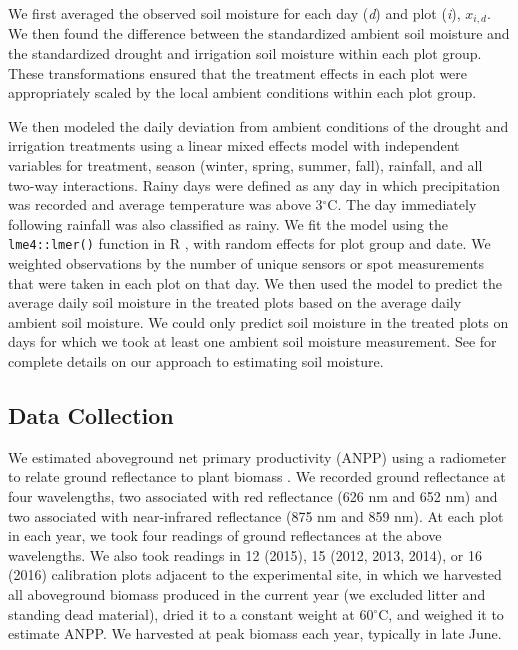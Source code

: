 \documentclass[fleqn,10pt,lineno]{wlpeerj} %
\begin{document}
We first averaged the observed soil moisture for each day (\emph{d}) and
plot (\emph{i}), \(x_{i,d}\).
We then found the difference between the standardized ambient soil
moisture and the standardized drought and irrigation soil moisture
within each plot group. These transformations ensured that the treatment
effects in each plot were appropriately scaled by the local ambient
conditions within each plot group.

We then modeled the daily deviation from ambient conditions of the
drought and irrigation treatments using a linear mixed effects model
with independent variables for treatment, season (winter, spring,
summer, fall), rainfall, and all two-way interactions. Rainy days were
defined as any day in which precipitation was recorded and average
temperature was above 3\(^{\circ}\)C. The day immediately following
rainfall was also classified as rainy. We fit the model using the
\texttt{lme4::lmer()} function \citep{Bates2015} in R \citep{R2016},
with random effects for plot group and date. We weighted observations by
the number of unique sensors or spot measurements that were taken in
each plot on that day. We then used the model to predict the average
daily soil moisture in the treated plots based on the average daily
ambient soil moisture. We could only predict soil moisture in the
treated plots on days for which we took at least one ambient soil
moisture measurement. See \citet{Kleinhesselink2017b} for complete
details on our approach to estimating soil moisture.

\subsection{Data Collection}\label{data-collection}

We estimated aboveground net primary productivity (ANPP) using a
radiometer to relate ground reflectance to plant biomass \citep[see][
for a review]{Byrne2011}. We recorded ground reflectance at four
wavelengths, two associated with red reflectance (626 nm and 652 nm) and
two associated with near-infrared reflectance (875 nm and 859 nm). At
each plot in each year, we took four readings of ground reflectances at
the above wavelengths. We also took readings in 12 (2015), 15 (2012,
2013, 2014), or 16 (2016) calibration plots adjacent to the experimental
site, in which we harvested all aboveground biomass produced in the
current year (we excluded litter and standing dead material), dried it
to a constant weight at 60\(^{\circ}\)C, and weighed it to estimate
ANPP. We harvested at peak biomass each year, typically in late June.
\end{document}
